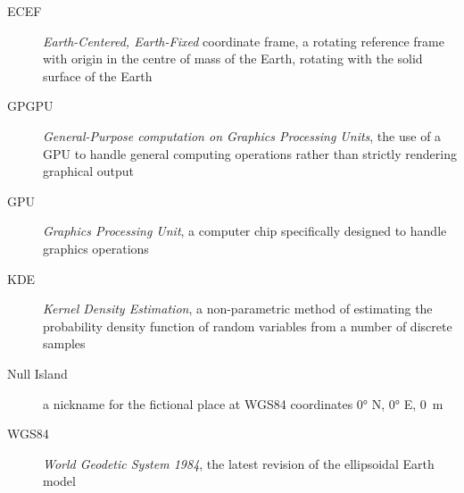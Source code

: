 \begin{description}
    \item[ECEF]
        \emph{Earth-Centered, Earth-Fixed} coordinate frame, a rotating reference frame with origin
        in the centre of mass of the Earth, rotating with the solid surface of the Earth \cite{ecef}
    \item[GPGPU]
        \emph{General-Purpose computation on Graphics Processing Units},
        the use of a GPU to handle general computing operations rather than strictly rendering graphical output \cite{gpgpu}
    \item[GPU]
        \emph{Graphics Processing Unit}, a computer chip specifically designed to handle graphics operations \cite{gpu}
    \item[KDE]
        \emph{Kernel Density Estimation}, a non-parametric method of estimating the probability density function
        of random variables from a number of discrete samples \cite{kde}
    \item[Null Island]
        a nickname for the fictional place at WGS84 coordinates \ang{0} N, \ang{0} E, \SI{0}{\metre} \cite{null-island}
    \item[WGS84]
        \emph{World Geodetic System 1984}, the latest revision of the ellipsoidal Earth model
\end{description}
